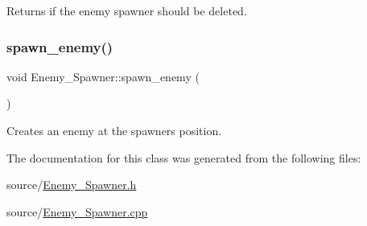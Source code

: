 Returns if the enemy spawner should be deleted. \mbox{\label{classEnemy__Spawner_aea2a6ce6be37d516aff5eb8e851a9366}} 
\subsubsection{\texorpdfstring{spawn\+\_\+enemy()}{spawn\_enemy()}}
{\footnotesize\ttfamily void Enemy\+\_\+\+Spawner\+::spawn\+\_\+enemy (\begin{DoxyParamCaption}{ }\end{DoxyParamCaption})}

Creates an enemy at the spawners position. 

The documentation for this class was generated from the following files\+:\begin{DoxyCompactItemize}
\item 
source/\hyperlink{Enemy__Spawner_8h}{Enemy\+\_\+\+Spawner.\+h}\item 
source/\hyperlink{Enemy__Spawner_8cpp}{Enemy\+\_\+\+Spawner.\+cpp}\end{DoxyCompactItemize}

